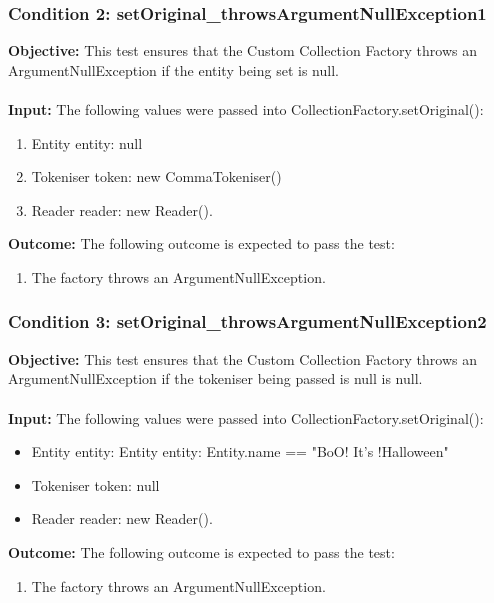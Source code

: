 \documentclass[a4paper,12pt]{article}
\begin{document}
		\subsubsection{Condition 2: setOriginal\_throwsArgumentNullException1}
			\textbf{Objective:} This test ensures that the Custom Collection Factory throws an ArgumentNullException if the entity being set is null.\\\\
			\textbf{Input:} The following values were passed into CollectionFactory.setOriginal():
				\begin{enumerate}
					\item Entity entity: null
					\item Tokeniser token: new CommaTokeniser()
					\item Reader reader: new Reader().
				\end{enumerate}
			\textbf{Outcome:} The following outcome is expected to pass the test:
				\begin{enumerate}
					\item The factory throws an ArgumentNullException.
				\end{enumerate}
		\subsubsection{Condition 3: setOriginal\_throwsArgumentNullException2}
			\textbf{Objective:} This test ensures that the Custom Collection Factory throws an ArgumentNullException if the tokeniser being passed is null is null.\\\\
			\textbf{Input:} The following values were passed into CollectionFactory.setOriginal():
				\begin{itemize}
					\item Entity entity: Entity entity: Entity.name == "BoO! It's !Halloween"
					\item Tokeniser token: null
					\item Reader reader: new Reader().
				\end{itemize}
			\textbf{Outcome:} The following outcome is expected to pass the test:
				\begin{enumerate}
					\item The factory throws an ArgumentNullException.
				\end{enumerate}
\end{document}

